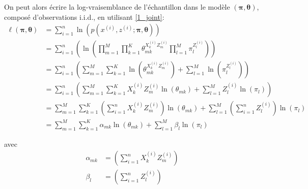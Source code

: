 \documentclass[12pt,a4paper,onecolumn]{article}
\begin{document}
On peut alors écrire la log-vraisemblance de l'échantillon dans le modèle \(( \bm{\pi}, \bm{\theta})\), composé d'observations i.i.d., en utilisant \ref{1_joint}:
\begin{align}
	\ell( \bm{\pi}, \bm{\theta}) & = \sum_{i = 1}^n \ln(p(x^{(i)}, z^{(i)} ; \bm{\pi}, \bm{\theta})) \nonumber                                                                                            \\
	                             & = \sum_{i = 1}^n\left(\ln\left(\prod_{m=1}^M \prod_{k=1}^K \theta_{mk}^{X_k^{(i)} Z_m^{(i)}} \prod_{l = 1}^M\pi_l^{Z_l^{(i)}}\right)\right)\nonumber                   \\
	                             & = \sum_{i = 1}^n\left(\sum_{m=1}^M \sum_{k=1}^K \ln(\theta_{mk}^{X_k^{(i)} Z_m^{(i)}}) + \sum_{l = 1}^M\ln(\pi_l^{Z_l^{(i)}})\right)\nonumber                          \\
	                             & = \sum_{i = 1}^n\left(\sum_{m=1}^M \sum_{k=1}^K X_k^{(i)} Z_m^{(i)}\ln(\theta_{mk}) + \sum_{l = 1}^M {Z_l^{(i)}}\ln(\pi_l)\right)\nonumber                             \\
	                             & = \sum_{m=1}^M \sum_{k=1}^K \left(\sum_{i = 1}^n X_k^{(i)} Z_m^{(i)}\right)\ln(\theta_{mk}) + \sum_{l = 1}^M\left(\sum_{i = 1}^n {Z_l^{(i)}}\right)\ln(\pi_l)\nonumber \\
	                             & = \sum_{m=1}^M \sum_{k=1}^K \alpha_{mk}\ln(\theta_{mk}) + \sum_{l = 1}^M \beta_l\ln(\pi_l)
\end{align}

avec
\begin{align*}
	\alpha_{mk} & = \left(\sum_{i = 1}^n X_k^{(i)} Z_m^{(i)}\right) \\
	\beta_l     & = \left(\sum_{i = 1}^n {Z_l^{(i)}}\right)
\end{align*}
\end{document}
